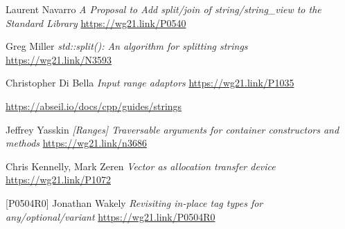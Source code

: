 \documentclass{wg21}
\begin{document}
\begin{thebibliography}{9}
    Laurent Navarro
    \emph{A Proposal to Add split/join of string/string_view to the Standard Library}\newline
    \url{https://wg21.link/P0540}

    Greg Miller
    \emph{std::split(): An algorithm for splitting strings}\newline
    \url{https://wg21.link/N3593}

    Christopher Di Bella
    \emph{Input range adaptors}\newline
    \url{https://wg21.link/P1035}

    \url{https://abseil.io/docs/cpp/guides/strings}

    Jeffrey Yasskin
    \emph{[Ranges] Traversable arguments for container constructors and methods}\newline
    \url{https://wg21.link/n3686}

	Chris Kennelly, Mark Zeren
	\emph{Vector as allocation transfer device}
	\url{https://wg21.link/P1072}

[P0504R0]
	Jonathan Wakely
	\emph{Revisiting in-place tag types for any/optional/variant}
	\url{https://wg21.link/P0504R0}


\end{thebibliography}
\end{document}
